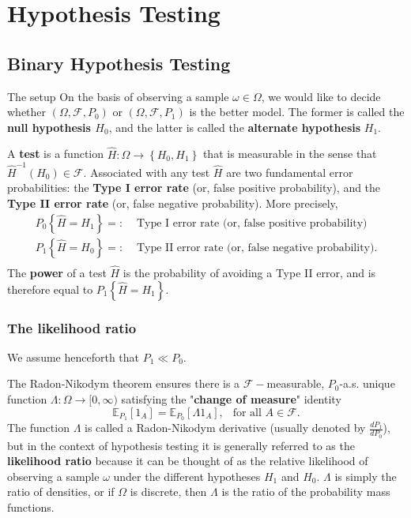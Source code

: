 \section{Hypothesis Testing}

\subsection{Binary Hypothesis Testing}

\begin{defn}{The setup}{}
On the basis of observing a sample \(\omega \in \Omega \), we would like to decide whether \((\Omega , \mathcal{F} ,P_0)\)  or \((\Omega , \mathcal{F} ,P_1)\) is the better model. The former is called the \textbf{null hypothesis \(H_0\)}, and the latter is called the \textbf{alternate hypothesis }\(H_1\). 

A \textbf{test} is a function \(\hat{H} : \Omega \to \left\{ H_0, H_1 \right\} \) that is measurable in the sense that \(\hat{H} ^{-1} (H_0) \in \mathcal{F} \). 
Associated with any test \(\hat{H} \) are two fundamental error probabilities: the \textbf{Type I error rate} (or, false positive probability), and the \textbf{Type II error rate} (or, false negative probability). More precisely, 
\begin{align*}
    P_ 0 {\left\{ \hat{H} = H_1 \right\} } =:& \text{ Type I error rate (or, false positive probability)} \\
    P_ 1 {\left\{ \hat{H} = H_0 \right\} } =:& \text{ Type II error rate (or, false negative probability).} \\
\end{align*}
The \textbf{power} of a test \(\hat{H} \) is the probability of avoiding a Type II error, and is therefore equal to \(P_1 \left\{\hat{H} = H _1 \right\} \). 

\end{defn}

\subsubsection{The likelihood ratio}

We assume henceforth that \(P_1 \ll P_0\). 

\begin{defn}{}{}
The Radon-Nikodym theorem ensures there is a \(\mathcal{F} -\)measurable, \(P _0\)-a.s. unique function \(\Lambda :\Omega \to [0, \infty )\) satisfying the "\textbf{change of measure}" identity
\[
    \mathbb{E} _{P_1}\left[ 1_A \right] = \mathbb{E} _{P_0} \left[ \Lambda 1_A\right] , \ \ \text{ for all } A \in \mathcal{F}. 
\]
The function \(\Lambda \) is called a Radon-Nikodym derivative (usually denoted by \(\frac{dP_1}{dP_0} \)), but in the context of hypothesis testing it is generally referred to as the \textbf{likelihood ratio} because it can be thought of as the relative likelihood of observing a sample \(\omega \) under the different hypotheses \(H_{1} \) and \(H_0\). \(\Lambda \)  is simply the ratio of densities, or if \(\Omega \) is discrete, then \(\Lambda \) is the ratio of the probability mass functions. 

\end{defn}

